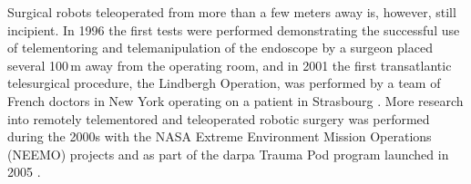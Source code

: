 Surgical robots teleoperated from more than a few meters away is, however, still incipient. In 1996 the first tests were performed demonstrating the successful use of telementoring and telemanipulation of the endoscope by a surgeon placed several 100\,m away from the operating room, %
%
%
and in 2001 the first transatlantic telesurgical procedure, the Lindbergh Operation, was performed by a team of French doctors in New York %
operating on a patient in Strasbourg \citep{bib:telesurg_history}. More research into remotely telementored and teleoperated robotic surgery was performed during the 2000s with the NASA Extreme Environment Mission Operations (NEEMO) projects  %
%
and as part of the \gls{darpa} Trauma Pod program launched in 2005 \citep{bib:surgical_book,bib:docatadist}.




%
%

